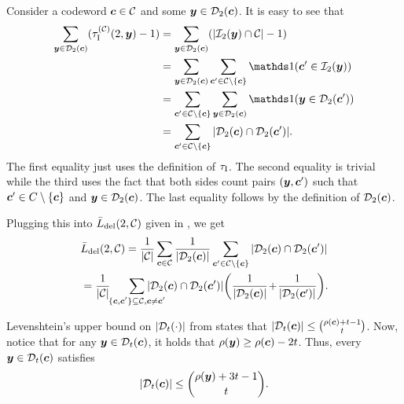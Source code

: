 \documentclass[conference, a4paper]{IEEEtran}
\begin{document}
\begin{IEEEproof}
Consider a codeword ${\boldsymbol c} \in \mathcal{C}$ and some ${\boldsymbol y} \in \mathcal{D}_{2}({\boldsymbol c})$. It is easy to see that
\begin{align}
    \sum_{\bfy \in \balldel{\bfc}{2}} (\tauI^{(\cC)}(2,\bfy) - 1)
    &= \sum_{\bfy \in \balldel{\bfc}{2}} (|\ballins{\bfy}{2} \cap \cC| - 1) \nonumber \\
    &= \sum_{\bfy \in \balldel{\bfc}{2}} \sum_{\bfc' \in \cC \setminus \{\bfc\}} \mathbbm{1}(\bfc' \in \ballins{\bfy}{2}) \nonumber \\
    &= \sum_{\bfc' \in \cC \setminus \{\bfc\}} \sum_{\bfy \in \balldel{\bfc}{2}} \mathbbm{1}(\bfy \in \balldel{\bfc'}{2}) \nonumber  \\
    &= \sum_{\bfc' \in \cC \setminus \{\bfc\}} |\balldel{\bfc}{2} \cap \balldel{\bfc'}{2}|. \nonumber %
\end{align}
The first equality just uses the definition of $\tau_{\mathrm{I}}$. The second equality is trivial while the third uses the fact that both sides count pairs $({\boldsymbol y}, {\boldsymbol c}')$ such that ${\boldsymbol c}' \in C \setminus \{{\boldsymbol c} \}$ and ${\boldsymbol y} \in \mathcal{D}_{2}({\boldsymbol c})$. The last equality follows by the definition of $\mathcal{D}_{2}({\boldsymbol c})$.

Plugging this into $\bar{L}_\mathrm{del}(2,\mathcal{C})$ given in , we get
\begin{align}
    &\listdel{2}{\cC} 
    = \frac{1}{|\cC|} \sum_{\bfc \in \cC} \frac{1}{|\balldel{\bfc}{2}|} \sum_{\bfc' \in \cC \setminus \{\bfc\}} |\balldel{\bfc}{2} \cap \balldel{\bfc'}{2}| \nonumber \\
    &= \frac{1}{|\cC|}\!\! \sum_{\substack{\{ \bfc,\bfc'\} \subseteq \cC, \bfc \neq \bfc'}}\!\!\!\!\!\!\!\! \!\!\! |\balldel{\bfc}{2} \cap \balldel{\bfc'}{2}| \!\left(\frac{1}{|\balldel{\bfc}{2}|} \!+\! \frac{1}{|\balldel{\bfc'}{2}|}\right)\!.\!\label{eq::ldel-t} 
\end{align}

 
Levenshtein's upper bound on $|\mathcal{D}_{t}(\cdot)|$ from \cite{levenshtein2002bounds} states that $|\mathcal{D}_{t}({\boldsymbol c})| \leq \binom{\rho({\boldsymbol c}) + t-1}{t}$. 
Now, notice that for any ${\boldsymbol y} \in \mathcal{D}_{t}({\boldsymbol c})$, it holds that $\rho({\boldsymbol y}) \geq \rho({\boldsymbol c}) - 2t$. Thus, every ${\boldsymbol y} \in \mathcal{D}_{t}({\boldsymbol c})$ satisfies
\begin{align}
    |\mathcal{D}_{t}({\boldsymbol c})| \leq \binom{\rho({\boldsymbol y}) + 3t-1}{t}. \nonumber
\end{align}



\end{IEEEproof}
\end{document}

